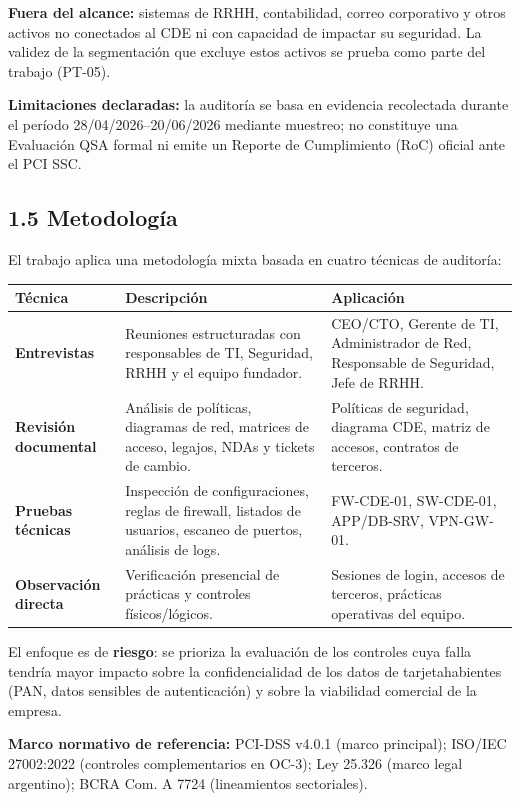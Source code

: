 \documentclass[11pt,a4paper]{article}
\begin{document}
\textbf{Fuera del alcance:} sistemas de RRHH, contabilidad, correo corporativo y otros activos no conectados al CDE ni con capacidad de impactar su seguridad. La validez de la segmentación que excluye estos activos se prueba como parte del trabajo (PT-05).

\textbf{Limitaciones declaradas:} la auditoría se basa en evidencia recolectada durante el período 28/04/2026–20/06/2026 mediante muestreo; no constituye una Evaluación QSA formal ni emite un Reporte de Cumplimiento (RoC) oficial ante el PCI SSC.

\subsection{1.5 Metodología}

El trabajo aplica una metodología mixta basada en cuatro técnicas de auditoría:

\begin{tabularx}{\textwidth}{P{3cm}P{4cm}L}
\toprule
\textbf{Técnica} & \textbf{Descripción} & \textbf{Aplicación} \\
\midrule
\textbf{Entrevistas} & Reuniones estructuradas con responsables de TI, Seguridad, RRHH y el equipo fundador. & CEO/CTO, Gerente de TI, Administrador de Red, Responsable de Seguridad, Jefe de RRHH. \\
\textbf{Revisión documental} & Análisis de políticas, diagramas de red, matrices de acceso, legajos, NDAs y tickets de cambio. & Políticas de seguridad, diagrama CDE, matriz de accesos, contratos de terceros. \\
\textbf{Pruebas técnicas} & Inspección de configuraciones, reglas de firewall, listados de usuarios, escaneo de puertos, análisis de logs. & FW-CDE-01, SW-CDE-01, APP/DB-SRV, VPN-GW-01. \\
\textbf{Observación directa} & Verificación presencial de prácticas y controles físicos/lógicos. & Sesiones de login, accesos de terceros, prácticas operativas del equipo. \\
\bottomrule
\end{tabularx}

El enfoque es de \textbf{riesgo}: se prioriza la evaluación de los controles cuya falla tendría mayor impacto sobre la confidencialidad de los datos de tarjetahabientes (PAN, datos sensibles de autenticación) y sobre la viabilidad comercial de la empresa.

\textbf{Marco normativo de referencia:} PCI-DSS v4.0.1 (marco principal); ISO/IEC 27002:2022 (controles complementarios en OC-3); Ley 25.326 (marco legal argentino); BCRA Com. A 7724 (lineamientos sectoriales).
\end{document}
